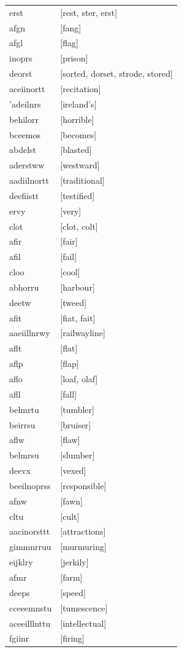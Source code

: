 \documentclass{article}
\begin{document}
\begin{tabular}{ll}
erst & [rest, ster, erst] \\
afgn & [fang] \\
afgl & [flag] \\
inoprs & [prison] \\
deorst & [sorted, dorset, strode, stored] \\
aceiinortt & [recitation] \\
'adeilnrs & [ireland's] \\
behilorr & [horrible] \\
bceemos & [becomes] \\
abdelst & [blasted] \\
aderstww & [westward] \\
aadiilnortt & [traditional] \\
deefiistt & [testified] \\
ervy & [very] \\
clot & [clot, colt] \\
afir & [fair] \\
afil & [fail] \\
cloo & [cool] \\
abhorru & [harbour] \\
deetw & [tweed] \\
afit & [fiat, fait] \\
aaeiillnrwy & [railwayline] \\
aflt & [flat] \\
aflp & [flap] \\
aflo & [loaf, olaf] \\
afll & [fall] \\
belmrtu & [tumbler] \\
beirrsu & [bruiser] \\
aflw & [flaw] \\
belmrsu & [slumber] \\
deevx & [vexed] \\
beeilnoprss & [responsible] \\
afnw & [fawn] \\
cltu & [cult] \\
aacinorsttt & [attractions] \\
gimmnrruu & [murmuring] \\
eijklry & [jerkily] \\
afmr & [farm] \\
deeps & [speed] \\
cceeemnstu & [tumescence] \\
aceeilllnttu & [intellectual] \\
fgiinr & [firing] \\

\end{tabular}
\end{document}
